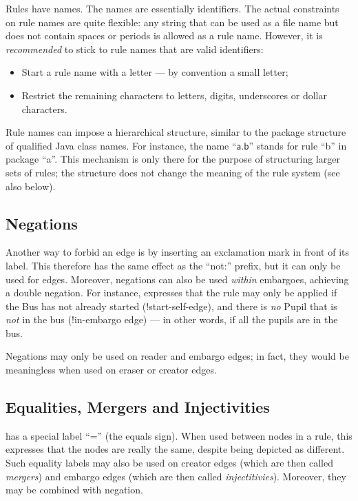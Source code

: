Rules have names. The names are essentially identifiers. The actual constraints
on rule names are quite flexible: any string that can be used as a file name
but does not contain spaces or periods is allowed as a rule name. However, it
is \emph{recommended} to stick to rule names that are valid identifiers:
%
\begin{itemize}\noitemsep
\item Start a rule name with a letter --- by convention a small letter;
\item Restrict the remaining characters to letters, digits, underscores or
  dollar characters.
\end{itemize}
%
Rule names can impose a hierarchical structure, similar to the package
structure of qualified Java class names. For instance, the name
``$\textsf{a.b}$'' stands for rule ``\textsf{b}'' in package
``\textsf{a}''. This mechanism is only there for the purpose of structuring
larger sets of rules; the structure does not change the meaning of the rule
system (see also  below).

\subsection{Negations}

Another way to forbid an edge is by inserting an exclamation mark in front of
its label. This therefore has the same effect as the ``\textsf{not:}'' prefix,
but it can only be used for edges. Moreover, negations can also be used
\emph{within} embargoes, achieving a double negation. For instance,
 expresses that the rule may only be applied if the
\textsf{Bus} has not already started (\textsf{!start}-self-edge), and there is
\emph{no} \textsf{Pupil} that is \emph{not} in the bus (\textsf{!in}-embargo
edge) --- in other words, if all the pupils are in the bus.


Negations may only be used on reader and embargo edges; in fact, they would be
meaningless when used on eraser or creator edges.

\subsection{Equalities, Mergers and Injectivities}

\Groove{} has a special label ``\textsf{=}'' (the equals sign). When used
between nodes in a rule, this expresses that the nodes are really the same,
despite being depicted as different. Such equality labels may also be used on
creator edges (which are then called \emph{mergers}) and embargo edges (which
are then called \emph{injectitivies}). Moreover, they may be combined with
negation.

